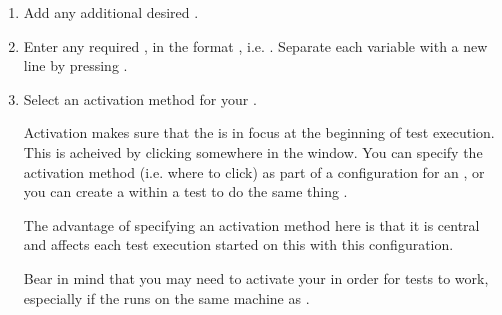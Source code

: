 \begin{enumerate}
\item Add any additional desired . 
\item Enter any required , in the
format , i.e. . 
Separate each variable with a new line by pressing .



\item Select an activation method for your \gdaut{}. 


Activation makes sure that the  \gdaut{} is in focus at the beginning of test execution. This is acheived by clicking somewhere in the \gdaut{} window. You can specify the activation method (i.e. where to click) as part of a configuration for an \gdaut{}, or you can create a \gdstep{} within a test to do the same thing . 

The advantage of specifying an activation method here is that it is central and affects each test execution started on this \gdaut{} with this configuration. 

Bear in mind that you may need to activate your \gdaut{} in order for tests to work, especially if the \gdaut{} runs on the same machine as \app{}. 

\end{enumerate}


\clearpage
